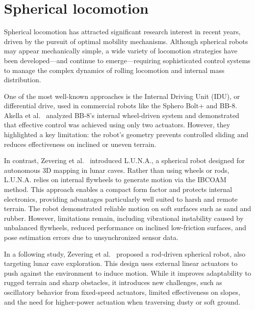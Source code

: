 \documentclass[english, bachelor, utf8]{base/thesis_telematics}
\begin{document}
\section{Spherical locomotion}\label{sec:sphere-locomotion}
Spherical locomotion has attracted significant research interest in recent years, driven by the pursuit of optimal mobility mechanisms. 
Although spherical robots may appear mechanically simple, a wide variety of locomotion strategies have been developed—and continue to emerge—requiring sophisticated control systems to manage the complex dynamics of rolling locomotion and internal mass distribution.

One of the most well-known approaches is the Internal Driving Unit (IDU), or differential drive, used in commercial robots like the Sphero Bolt+ and BB-8. 
Akella et al.~\cite{Sphero} analyzed BB-8’s internal wheel-driven system and demonstrated that effective control was achieved using only two actuators. 
However, they highlighted a key limitation: the robot’s geometry prevents controlled sliding and reduces effectiveness on inclined or uneven terrain.

In contrast, Zevering et al.~\cite{luna} introduced L.U.N.A., a spherical robot designed for autonomous 3D mapping in lunar caves. 
Rather than using wheels or rods, L.U.N.A. relies on internal flywheels to generate motion via the IBCOAM method. 
This approach enables a compact form factor and protects internal electronics, providing advantages particularly well suited to harsh and remote terrain. 
The robot demonstrated reliable motion on soft surfaces such as sand and rubber. 
However, limitations remain, including vibrational instability caused by unbalanced flywheels, reduced performance on inclined low-friction surfaces, and pose estimation errors due to unsynchronized sensor data.

In a following study, Zevering et al.~\cite{rod_sphere} proposed a rod-driven spherical robot, also targeting lunar cave exploration. 
This design uses external linear actuators to push against the environment to induce motion. 
While it improves adaptability to rugged terrain and sharp obstacles, it introduces new challenges, such as oscillatory behavior from fixed-speed actuators, limited effectiveness on slopes, and the need for higher-power actuation when traversing dusty or soft ground.
\end{document}

